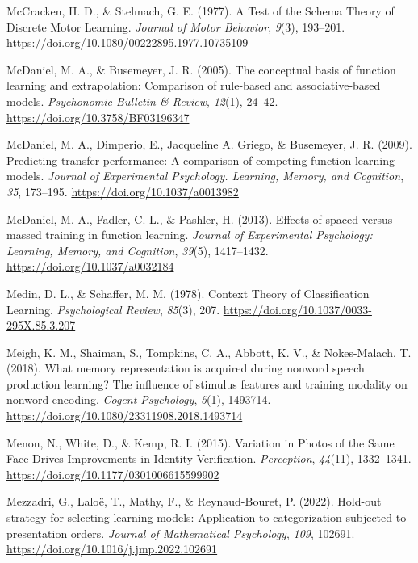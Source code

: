 \documentclass[
  11pt,
  letterpaper,
]{article}
\newlength{\cslhangindent}
\newenvironment{CSLReferences}[2] %
 {\begin{list}{}{%
  \setlength{\itemindent}{0pt}
  \setlength{\leftmargin}{0pt}
  \setlength{\parsep}{0pt}
  \ifodd #1
   \setlength{\leftmargin}{\cslhangindent}
   \setlength{\itemindent}{-1\cslhangindent}
  \fi
  \setlength{\itemsep}{#2\baselineskip}}}
 {\end{list}}
\begin{document}
\begin{CSLReferences}{1}{0}
McCracken, H. D., \& Stelmach, G. E. (1977). A {Test} of the {Schema
Theory} of {Discrete Motor Learning}. \emph{Journal of Motor Behavior},
\emph{9}(3), 193--201.
\url{https://doi.org/10.1080/00222895.1977.10735109}

McDaniel, M. A., \& Busemeyer, J. R. (2005). The conceptual basis of
function learning and extrapolation: {Comparison} of rule-based and
associative-based models. \emph{Psychonomic Bulletin \& Review},
\emph{12}(1), 24--42. \url{https://doi.org/10.3758/BF03196347}

McDaniel, M. A., Dimperio, E., Jacqueline A. Griego, \& Busemeyer, J. R.
(2009). Predicting transfer performance: {A} comparison of competing
function learning models. \emph{Journal of Experimental Psychology.
Learning, Memory, and Cognition}, \emph{35}, 173--195.
\url{https://doi.org/10.1037/a0013982}

McDaniel, M. A., Fadler, C. L., \& Pashler, H. (2013). Effects of spaced
versus massed training in function learning. \emph{Journal of
Experimental Psychology: Learning, Memory, and Cognition}, \emph{39}(5),
1417--1432. \url{https://doi.org/10.1037/a0032184}

Medin, D. L., \& Schaffer, M. M. (1978). Context {Theory} of
{Classification Learning}. \emph{Psychological Review}, \emph{85}(3),
207. \url{https://doi.org/10.1037/0033-295X.85.3.207}

Meigh, K. M., Shaiman, S., Tompkins, C. A., Abbott, K. V., \&
Nokes-Malach, T. (2018). What memory representation is acquired during
nonword speech production learning? {The} influence of stimulus features
and training modality on nonword encoding. \emph{Cogent Psychology},
\emph{5}(1), 1493714.
\url{https://doi.org/10.1080/23311908.2018.1493714}

Menon, N., White, D., \& Kemp, R. I. (2015). Variation in {Photos} of
the {Same Face Drives Improvements} in {Identity Verification}.
\emph{Perception}, \emph{44}(11), 1332--1341.
\url{https://doi.org/10.1177/0301006615599902}

Mezzadri, G., Laloë, T., Mathy, F., \& Reynaud-Bouret, P. (2022).
Hold-out strategy for selecting learning models: {Application} to
categorization subjected to presentation orders. \emph{Journal of
Mathematical Psychology}, \emph{109}, 102691.
\url{https://doi.org/10.1016/j.jmp.2022.102691}


\end{CSLReferences}
\end{document}
